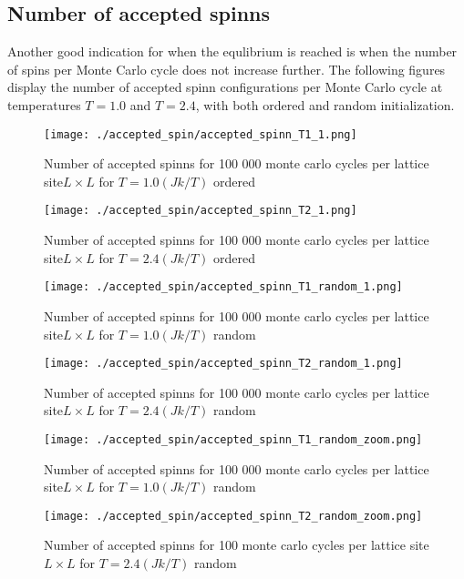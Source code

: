 \documentclass[../main.tex]{subfiles}
\begin{document}
\subsection*{Number of accepted spinns}
Another good indication for when the equlibrium is reached is when the number of spins per Monte Carlo cycle does not increase further.  The following figures display the number of accepted spinn configurations per Monte Carlo cycle at temperatures $T = 1.0$ and $T = 2.4$, with both ordered and random initialization.

\begin{figure}[!ht]
  \centering
  \parbox{5cm}{
  \texttt{[image: ./accepted\_spin/accepted\_spinn\_T1\_1.png]}
  \caption{Number of accepted spinns for 100 000 monte carlo cycles per lattice site$L\times L$ for $T= 1.0(Jk/T)$ ordered}
  \label{fig:accepted_spinnT1}}
  \qquad
  \begin{minipage}{5cm}
    \texttt{[image: ./accepted\_spin/accepted\_spinn\_T2\_1.png]}
    \caption{Number of accepted spinns for 100 000 monte carlo cycles per lattice site$L\times L$ for $T= 2.4(Jk/T)$ ordered}
    \label{fig:accepted_spinnT2}
  \end{minipage}
  \end{figure}
\FloatBarrier

\begin{figure}[!ht]
  \centering
  \parbox{5cm}{
  \texttt{[image: ./accepted\_spin/accepted\_spinn\_T1\_random\_1.png]}
  \caption{Number of accepted spinns for 100 000 monte carlo cycles per lattice site$L\times L$ for $T= 1.0(Jk/T)$ random}
  \label{fig:accepted_spinnT1_random}}
  \qquad
  \begin{minipage}{5cm}
    \texttt{[image: ./accepted\_spin/accepted\_spinn\_T2\_random\_1.png]}
    \caption{Number of accepted spinns for 100 000 monte carlo cycles per lattice site$L\times L$ for $T= 2.4(Jk/T)$ random}
    \label{fig:accepted_spinnT2_random}
  \end{minipage}
  \end{figure}
\FloatBarrier

\begin{figure}[!ht]
  \centering
  \parbox{5cm}{
  \texttt{[image: ./accepted\_spin/accepted\_spinn\_T1\_random\_zoom.png]}
  \caption{Number of accepted spinns for 100 000 monte carlo cycles per lattice site$L\times L$ for $T= 1.0(Jk/T)$ random}
  \label{fig:accepted_spinnT1_random_zoom}}
  \qquad
  \begin{minipage}{5cm}
    \texttt{[image: ./accepted\_spin/accepted\_spinn\_T2\_random\_zoom.png]}
    \caption{Number of accepted spinns for 100 monte carlo cycles per lattice site$L\times L$ for $T= 2.4(Jk/T)$ random}
    \label{fig:accepted_spinnT2_random_zoom}
  \end{minipage}
  \end{figure}
\FloatBarrier
\end{document}
